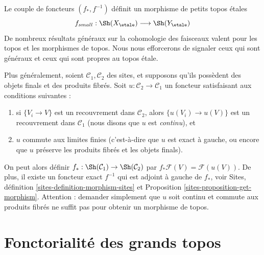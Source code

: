 \noindent
Le couple de foncteurs $(f_*, f^{-1})$ d\'efinit un morphisme de petits topos \'etales
$$
f_{small} :
\Sh(X_\etale)
\longrightarrow
\Sh(Y_\etale)
$$
De nombreux r\'esultats g\'en\'eraux sur la cohomologie des faisceaux valent pour les topos et les
morphismes de topos. Nous nous efforcerons de signaler ceux qui sont
g\'en\'eraux et ceux qui sont propres au topos \'etale.

\begin{remark}
\label{remark-functoriality-general}
Plus g\'en\'eralement, soient $\mathcal{C}_1, \mathcal{C}_2$ des sites, et
supposons qu'ils poss\`edent des objets finals et des produits fibr\'es. Soit
$u: \mathcal{C}_2 \to \mathcal{C}_1$ un foncteur satisfaisant aux conditions suivantes :
\begin{enumerate}
\item si $\{V_i \to V\}$ est un recouvrement dans $\mathcal{C}_2$, alors
$\{u(V_i) \to u(V)\}$ est un recouvrement dans $\mathcal{C}_1$ (nous
disons que $u$ est {\it continu}), et
\item $u$ commute aux limites finies (c'est-\`a-dire que $u$ est exact \`a gauche, ou encore que
$u$ pr\'eserve les produits fibr\'es et les objets finals).
\end{enumerate}
On peut alors d\'efinir
$f_*: \Sh(\mathcal{C}_1) \to \Sh(\mathcal{C}_2)$
par $ f_* \mathcal{F}(V) = \mathcal{F}(u(V))$.
De plus, il existe un foncteur exact $f^{-1}$ qui
est adjoint \`a gauche de $f_*$, voir
Sites, définition \ref{sites-definition-morphism-sites} et
Proposition \ref{sites-proposition-get-morphism}.
Attention : demander simplement que $u$ soit continu
et commute aux produits fibr\'es ne suffit pas pour obtenir un morphisme de topos.
\end{remark}




\section{Fonctorialit\'e des grands topos}
\label{section-functoriality-big-topoi}

